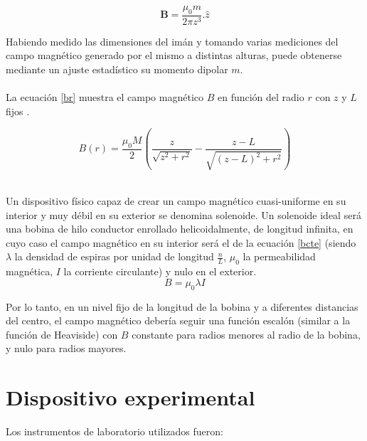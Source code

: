 \documentclass[12pt]{article}
\begin{document}
\begin{equation}
    \textbf{B}=\frac{\mu_0m}{2\pi z^3}.\textbf{$\hat{z}$}
    \label{campoiman}
\end{equation}

Habiendo medido las dimensiones del imán y tomando varias mediciones del campo magnético generado por el mismo a distintas alturas, puede obtenerse mediante un ajuste estadístico su momento dipolar $m$.\\
\\
La ecuación \ref{br} muestra el campo magnético $B$ en función del radio $r$ con $z$ y $L$ fijos \cite{imanradio}.

\begin{equation}
    B(r)=\frac{\mu_0M}{2}(\frac{z}{\sqrt{z^2+r^2}}-\frac{z-L}{\sqrt{(z-L)^2+r^2}})
    \label{br}
\end{equation}

\\

Un dispositivo físico capaz de crear un campo magnético cuasi-uniforme en su interior y muy débil en su exterior se denomina solenoide. Un solenoide ideal será una bobina de hilo conductor enrollado helicoidalmente, de longitud infinita, en cuyo caso el campo magnético en su interior será el de la ecuación \ref{bcte} (siendo $\lambda$ la densidad de espiras por unidad de longitud $\frac{n}{L}$, $\mu_0$ la permeabilidad magnética, $I$ la corriente circulante) y nulo en el exterior.\\

\begin{equation}
    B = \mu_0\lambda I
    \label{bcte}
\end{equation}

Por lo tanto, en un nivel fijo de la longitud de la bobina y a diferentes distancias del centro, el campo magnético debería seguir una función escalón (similar a la función de Heaviside) con $B$ constante para radios menores al radio de la bobina, y nulo para radios mayores.

\section{Dispositivo experimental}

Los instrumentos de laboratorio utilizados fueron:
\end{document}
